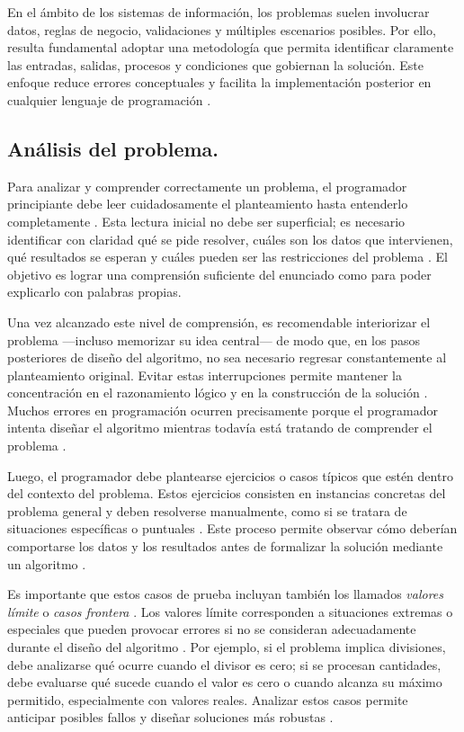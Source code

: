 \documentclass[12pt,twoside]{book}
\begin{document}
					En el ámbito de los sistemas de información, los problemas suelen involucrar datos, reglas de negocio, validaciones y múltiples escenarios posibles. Por ello, resulta fundamental adoptar una metodología que permita identificar claramente las entradas, salidas, procesos y condiciones que gobiernan la solución. Este enfoque reduce errores conceptuales y facilita la implementación posterior en cualquier lenguaje de programación \cite{Halterman2018Fundamentals, Pressman2019Software}.
					
					\subsection{Análisis del problema.}
						Para analizar y comprender correctamente un problema, el programador principiante debe leer cuidadosamente el planteamiento hasta entenderlo completamente \cite{Wing2006Computational,Farrell2018Programming}. Esta lectura inicial no debe ser superficial; es necesario identificar con claridad qué se pide resolver, cuáles son los datos que intervienen, qué resultados se esperan y cuáles pueden ser las restricciones del problema \cite{Joyanes2007Fundamentos}. El objetivo es lograr una comprensión suficiente del enunciado como para poder explicarlo con palabras propias.
						
						Una vez alcanzado este nivel de comprensión, es recomendable interiorizar el problema —incluso memorizar su idea central— de modo que, en los pasos posteriores de diseño del algoritmo, no sea necesario regresar constantemente al planteamiento original. Evitar estas interrupciones permite mantener la concentración en el razonamiento lógico y en la construcción de la solución \cite{Gaddis2022Starting}. Muchos errores en programación ocurren precisamente porque el programador intenta diseñar el algoritmo mientras todavía está tratando de comprender el problema \cite{Pressman2019Software}.
						
						Luego, el programador debe plantearse ejercicios o casos típicos que estén dentro del contexto del problema. Estos ejercicios consisten en instancias concretas del problema general y deben resolverse manualmente, como si se tratara de situaciones específicas o puntuales \cite{Farrell2018Programming}. Este proceso permite observar cómo deberían comportarse los datos y los resultados antes de formalizar la solución mediante un algoritmo \cite{Cormen2022Introduction}.
						
						Es importante que estos casos de prueba incluyan también los llamados \emph{valores límite} o \emph{casos frontera} \cite{Sommerville2015Software}. Los valores límite corresponden a situaciones extremas o especiales que pueden provocar errores si no se consideran adecuadamente durante el diseño del algoritmo \cite{Pressman2019Software}. Por ejemplo, si el problema implica divisiones, debe analizarse qué ocurre cuando el divisor es cero; si se procesan cantidades, debe evaluarse qué sucede cuando el valor es cero o cuando alcanza su máximo permitido, especialmente con valores reales. Analizar estos casos permite anticipar posibles fallos y diseñar soluciones más robustas \cite{Gaddis2022Starting}.
						
\end{document}
